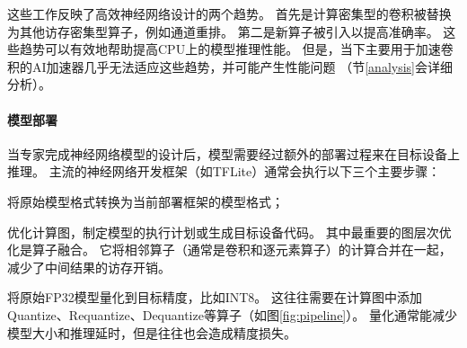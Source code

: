 这些工作反映了高效神经网络设计的两个趋势。
首先是计算密集型的卷积被替换为其他访存密集型算子，例如通道重排。
第二是新算子被引入以提高准确率。
这些趋势可以有效地帮助提高CPU上的模型推理性能。
但是，当下主要用于加速卷积的AI加速器几乎无法适应这些趋势，并可能产生性能问题
（节\ref{analysis}会详细分析）。

\paragraph{模型部署}
当专家完成神经网络模型的设计后，模型需要经过额外的部署过程来在目标设备上推理。
主流的神经网络开发框架（如TFLite）通常会执行以下三个主要步骤：
\begin{enumerate*}
    \item 将原始模型格式转换为当前部署框架的模型格式；
    \item 优化计算图，制定模型的执行计划或生成目标设备代码。
    其中最重要的图层次优化是算子融合。
    它将相邻算子（通常是卷积和逐元素算子）的计算合并在一起，减少了中间结果的访存开销。
    \item 将原始FP32模型量化到目标精度，比如INT8。
    这往往需要在计算图中添加Quantize、Requantize、Dequantize等算子（如图\ref{fig:pipeline}）。
    量化通常能减少模型大小和推理延时，但是往往也会造成精度损失。
\end{enumerate*}
